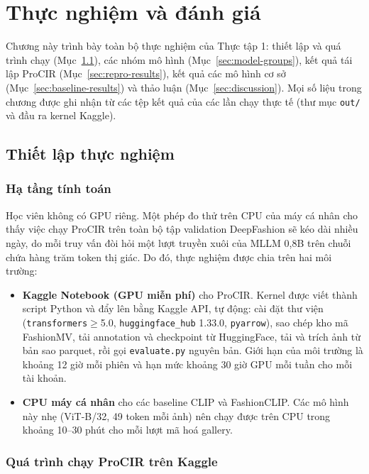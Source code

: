 \chapter{Thực nghiệm và đánh giá}\label{chapter:experiments}
\pagestyle{fancy}

Chương này trình bày toàn bộ thực nghiệm của Thực tập 1: thiết lập và quá trình chạy (Mục~\ref{sec:setup}), các nhóm mô hình (Mục~\ref{sec:model-groups}), kết quả tái lập ProCIR (Mục~\ref{sec:repro-results}), kết quả các mô hình cơ sở (Mục~\ref{sec:baseline-results}) và thảo luận (Mục~\ref{sec:discussion}). Mọi số liệu trong chương được ghi nhận từ các tệp kết quả của các lần chạy thực tế (thư mục \texttt{out/} và đầu ra kernel Kaggle).

\section{Thiết lập thực nghiệm}\label{sec:setup}

\subsection{Hạ tầng tính toán}

Học viên không có GPU riêng. Một phép đo thử trên CPU của máy cá nhân cho thấy việc chạy ProCIR trên toàn bộ tập validation DeepFashion sẽ kéo dài nhiều ngày, do mỗi truy vấn đòi hỏi một lượt truyền xuôi của MLLM 0,8B trên chuỗi chứa hàng trăm token thị giác. Do đó, thực nghiệm được chia trên hai môi trường:
\begin{itemize}
    \item \textbf{Kaggle Notebook (GPU miễn phí)} cho ProCIR. Kernel được viết thành script Python và đẩy lên bằng Kaggle API, tự động: cài đặt thư viện (\texttt{transformers}$\ge$5.0, \texttt{huggingface\_hub} 1.33.0, \texttt{pyarrow}), sao chép kho mã FashionMV, tải annotation và checkpoint từ HuggingFace, tải và trích ảnh từ bản sao parquet, rồi gọi \texttt{evaluate.py} nguyên bản. Giới hạn của môi trường là khoảng 12 giờ mỗi phiên và hạn mức khoảng 30 giờ GPU mỗi tuần cho mỗi tài khoản.
    \item \textbf{CPU máy cá nhân} cho các baseline CLIP và FashionCLIP. Các mô hình này nhẹ (ViT-B/32, 49 token mỗi ảnh) nên chạy được trên CPU trong khoảng 10--30 phút cho mỗi lượt mã hoá gallery.
\end{itemize}

\subsection{Quá trình chạy ProCIR trên Kaggle}

